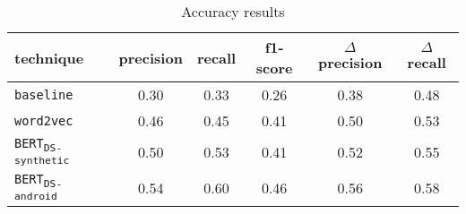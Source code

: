 \begin{table}[H]
\centering    
\begin{small}
\begin{threeparttable}
\begin{tabular}{lccccc}


\textbf{technique} & 
\textbf{precision} & \textbf{recall} & \textbf{f1-score} & 
$\Delta$ \textbf{precision} & $\Delta$ \textbf{recall} \\


\hline


\texttt{baseline} &
0.30 & 0.33 & 0.26 & 
0.38 & 0.48 
\\

\texttt{word2vec} &
0.46 & 0.45 & 0.41 & 
0.50 & 0.53
\\

\texttt{BERT\textsubscript{DS-synthetic}} &
0.50 & 0.53 & 0.41 & 
0.52 & 0.55 
\\

\texttt{BERT\textsubscript{DS-android}} &
0.54 & 0.60 & 0.46 & 
0.56 & 0.58 
\\

\hline

\end{tabular}
\end{threeparttable}
\end{small}
\caption{Accuracy results}
\label{tbl:approach-results-overall}
\end{table}


